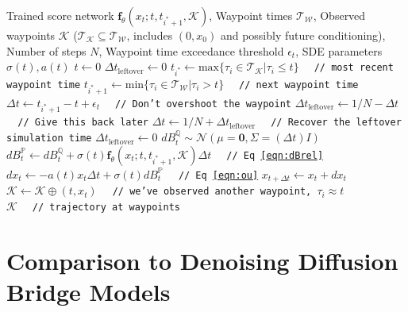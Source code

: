 \documentclass{article}
\begin{document}
\begin{algorithm}
\caption{Inference Procedure}\label{alg:inference}
\begin{algorithmic}[1]
\Require Trained score network $\mathbf{f}_\theta(x_t; t, t_{i^*+1}, \mathcal{K})$, Waypoint times $\mathcal{T_W}$, Observed waypoints $\mathcal{K}$ ($\mathcal{T_K} \subseteq \mathcal{T_W}$, includes $(0, x_0)$ and possibly future conditioning), Number of steps $N$, Waypoint time exceedance threshold $\epsilon_t$, SDE parameters $\sigma(t), a(t)$
\State $t \leftarrow 0$
\State $\Delta t_\text{leftover} \leftarrow 0$
    \State $t_{i^{*}} \gets \text{max}\{\tau_i \in \mathcal{T_K} | \tau_i \leq t\}$ \texttt{\ \ // most recent waypoint time}
    \State $t_{i^{*} + 1} \gets \text{min}\{\tau_i \in \mathcal{T_W} | \tau_i > t\}$ \texttt{\ \ // next waypoint time}
    \label{alg:line:adjust_timestep}
        \State $\Delta t \leftarrow t_{i^*+1} - t + \epsilon_t$ \texttt{\ \ // Don't overshoot the waypoint}
        \State $\Delta t_\text{leftover} \leftarrow 1 / N - \Delta t$ \texttt{\ \ // Give this back later}
    \Else
        \State $\Delta t \leftarrow 1 / N + \Delta t_\text{leftover}$ \texttt{\ \ // Recover the leftover simulation time}
        \State $\Delta t_\text{leftover} \leftarrow 0$
    \EndIf
    \State $dB^\mathbb{Q}_t \sim \mathcal{N}(\mu=\mathbf{0}, \Sigma=(\Delta t)I)$ %
    \State $dB^\mathbb{P}_t \gets dB^\mathbb{Q}_t + \sigma(t)\mathbf{f}_\theta(x_t; t, t_{i^*+1}, \mathcal{K})\Delta t$ \texttt{\ \ // Eq \ref{eqn:dBrel}}
    \State $dx_t \gets -a(t)x_t\Delta t + \sigma(t) dB^\mathbb{P}_t$ \texttt{\ \ // Eq \ref{eqn:ou}}
    \State $x_{t + \Delta t} \gets x_t + dx_t$
            \State $\mathcal{K} \gets \mathcal{K} \oplus (t, x_t)$ \texttt{\ \ // we've observed another waypoint, $\tau_i \approx t$}\label{line:observe_waypoint}
        \EndIf
    \EndFor
\EndWhile
\\
\Return $\mathcal{K}$ \texttt{\ \ // trajectory at waypoints}
\end{algorithmic}
\end{algorithm}

\newpage
\clearpage




\section{Comparison to Denoising Diffusion Bridge Models}\label{sec:comparison}
\end{document}
